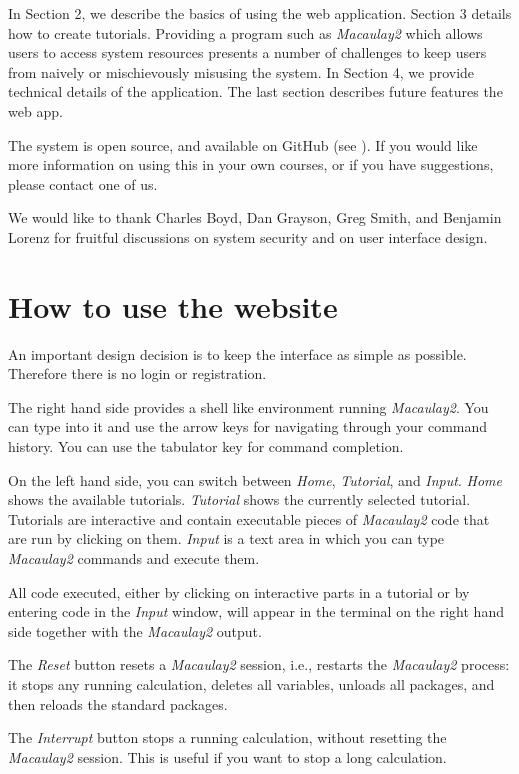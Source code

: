 \documentclass[twocolumn]{article}
\def\M2{{\it Macaulay2}}
\begin{document}
In Section 2, we describe the basics of using the web application.
Section 3 details how to create tutorials.
Providing a program such as \M2 which allows users to
access system resources presents a number of challenges to keep users
from naively or mischievously misusing the system.  In Section 4, we
provide technical details of the application.
The last section describes future features the web app.

The system is open source, and available on GitHub (see \cite{github}).
If you would like more information on using this in your own courses,
or if you have suggestions, please contact one of us.

We would like to thank Charles Boyd, Dan Grayson, Greg Smith, and Benjamin Lorenz for
fruitful discussions on system security and on user interface design.

\section{How to use the website}

An important
design decision is to keep the interface as simple as possible.
Therefore there is no login or registration.

The right hand side provides a shell like environment running
\M2. You can type into it and use the arrow keys for
navigating through your command history. You can use the tabulator 
key for command completion. 

On the left hand side, you can switch between {\it Home}, {\it
  Tutorial}, and {\it Input}. {\it Home} shows the available
 tutorials. {\it Tutorial} shows the currently selected
tutorial. Tutorials are interactive and contain executable pieces of
\M2 code that are run by clicking on them. {\it Input} is a
text area in which you can type \M2 commands and execute them.

All code executed, either by clicking on interactive parts in a
tutorial or by entering code in the {\it Input} window, will appear in 
the terminal on the right hand side together with the \M2 output.


The {\it Reset} button resets a \M2 session, i.e., restarts 
the \M2 process: it stops any running calculation, deletes all variables, 
unloads all packages, and then reloads the standard packages.

The {\it Interrupt} button stops a running calculation, without
resetting the \M2 session. This is useful if you want to stop a long calculation.
\end{document}
